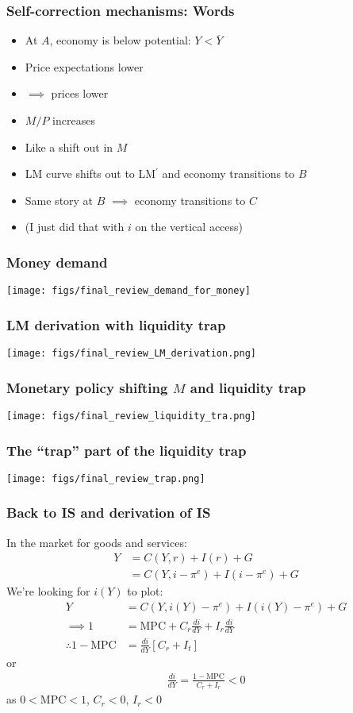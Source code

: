 \documentclass[presentation,dvipsnames]{beamer}
\begin{document}
\begin{frame}
\frametitle{Self-correction mechanisms: Words}
\begin{itemize}[label={--}]
\item At $A$, economy is below potential: $Y < \overline{Y}$
\item Price expectations lower
\item $\implies$ prices lower
\item $M/P$ increases 
\item Like a shift out in $M$
\item LM curve shifts out to LM$^{\prime}$ and economy transitions to $B$
\item Same story at $B$ $\implies$ economy transitions to $C$
\item (I just did that with $i$ on the vertical access)
\end{itemize}
\end{frame}

\begin{frame}
\frametitle{Money demand}
\centerline{\texttt{[image: figs/final\_review\_demand\_for\_money]}}
\end{frame}

\begin{frame}
\frametitle{LM derivation with liquidity trap}
\centerline{\texttt{[image: figs/final\_review\_LM\_derivation.png]}}
\end{frame}

\begin{frame}
\frametitle{Monetary policy shifting $M$ and liquidity trap}
\centerline{\texttt{[image: figs/final\_review\_liquidity\_tra.png]}}
\end{frame}

\begin{frame}
\frametitle{The ``trap'' part of the liquidity trap}
\centerline{\texttt{[image: figs/final\_review\_trap.png]}}
\end{frame}

\begin{frame}
\frametitle{Back to IS and derivation of IS}
In the market for goods and services:
\begin{align*}
Y &= C(Y,r) + I(r) + G \\
&= C(Y,i - \pi^{e}) + I(i - \pi^{e}) + G
\end{align*}
We're looking for $i(Y)$ to plot:
\begin{align*}
Y &= C(Y,i(Y) - \pi^{e}) + I(i(Y) - \pi^{e}) + G \\
\implies 1 &= \text{MPC} + C_{r}\frac{di}{dY} + I_{r} \frac{di}{dY} \\
\therefore 1 - \text{MPC} &= \frac{di}{dY} \left[ C_{r} + I_{t} \right]
\end{align*}
or
\begin{align*}
\frac{di}{dY} = \frac{1-\text{MPC}}{C_{r} + I_{r}} <0
\end{align*}
as $0< \text{MPC} < 1$, $C_{r} < 0$, $I_{r} < 0$
\end{frame}
\end{document}
